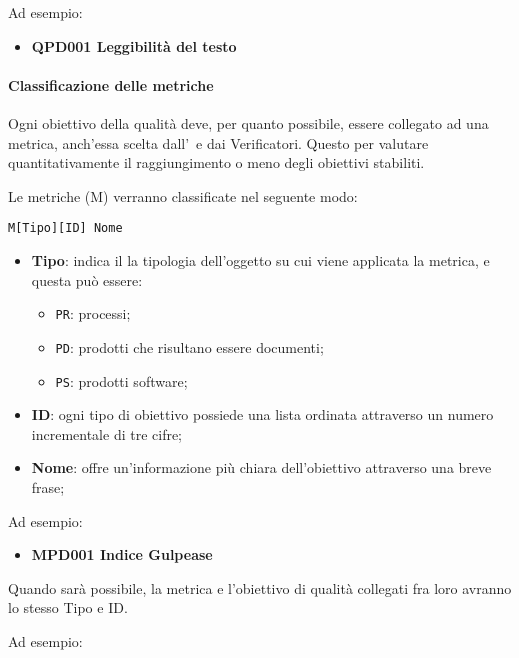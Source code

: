 			Ad esempio:

			\begin{itemize}
				\item \textbf{QPD001 Leggibilità del testo}
			\end{itemize}


			\paragraph{Classificazione delle metriche}\label{Classificazione metriche}
			Ogni obiettivo della qualità deve, per quanto possibile, essere collegato ad una metrica, anch'essa scelta dall'\Amm\ e dai Verificatori. Questo per valutare
			quantitativamente il raggiungimento o meno degli obiettivi stabiliti.

			Le metriche (M) verranno classificate nel seguente modo:

			\begin{center}
				\texttt{M[Tipo][ID] Nome}
			\end{center}

			\begin{itemize}
				\item \textbf{Tipo}: indica il la tipologia dell'oggetto su cui viene applicata la metrica, e questa può essere:
				\begin{itemize}
					\item \texttt{PR}: processi;
					\item \texttt{PD}: prodotti che risultano essere documenti;
					\item \texttt{PS}: prodotti software;
				\end{itemize}

				\item \textbf{ID}: ogni tipo di obiettivo possiede una lista ordinata attraverso un numero incrementale di tre cifre;
				\item \textbf{Nome}: offre un'informazione più chiara dell'obiettivo attraverso una breve frase;
			\end{itemize}

			Ad esempio:

			\begin{itemize}
				\item \textbf{MPD001 Indice Gulpease}
			\end{itemize}

			Quando sarà possibile, la metrica e l'obiettivo di qualità collegati fra loro avranno lo stesso Tipo e ID.

			Ad esempio:

